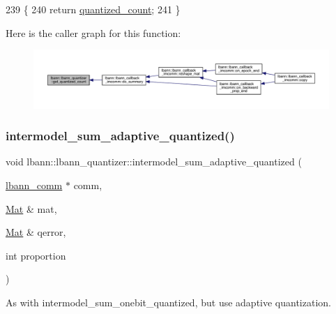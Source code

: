 \begin{DoxyCode}
239                                      \{
240     \textcolor{keywordflow}{return} \hyperlink{classlbann_1_1lbann__quantizer_a716fae78ef5ba082a8093f0d06550804}{quantized\_count};
241   \}
\end{DoxyCode}
Here is the caller graph for this function\+:\nopagebreak
\begin{figure}[H]
\begin{center}
\leavevmode
\includegraphics[width=350pt]{classlbann_1_1lbann__quantizer_afe560823e51a64b1bb42c6f6cbd83ee0_icgraph}
\end{center}
\end{figure}
\mbox{\label{classlbann_1_1lbann__quantizer_a87e856d8bf5e8a678a39cdb8f547dfd9}} 
\subsubsection{\texorpdfstring{intermodel\+\_\+sum\+\_\+adaptive\+\_\+quantized()}{intermodel\_sum\_adaptive\_quantized()}\hspace{0.1cm}{\footnotesize\ttfamily [1/2]}}
{\footnotesize\ttfamily void lbann\+::lbann\+\_\+quantizer\+::intermodel\+\_\+sum\+\_\+adaptive\+\_\+quantized (\begin{DoxyParamCaption}\item[{\hyperlink{classlbann_1_1lbann__comm}{lbann\+\_\+comm} $\ast$}]{comm,  }\item[{\hyperlink{base_8hpp_a68f11fdc31b62516cb310831bbe54d73}{Mat} \&}]{mat,  }\item[{\hyperlink{base_8hpp_a68f11fdc31b62516cb310831bbe54d73}{Mat} \&}]{qerror,  }\item[{int}]{proportion }\end{DoxyParamCaption})}

As with intermodel\+\_\+sum\+\_\+onebit\+\_\+quantized, but use adaptive quantization. 


